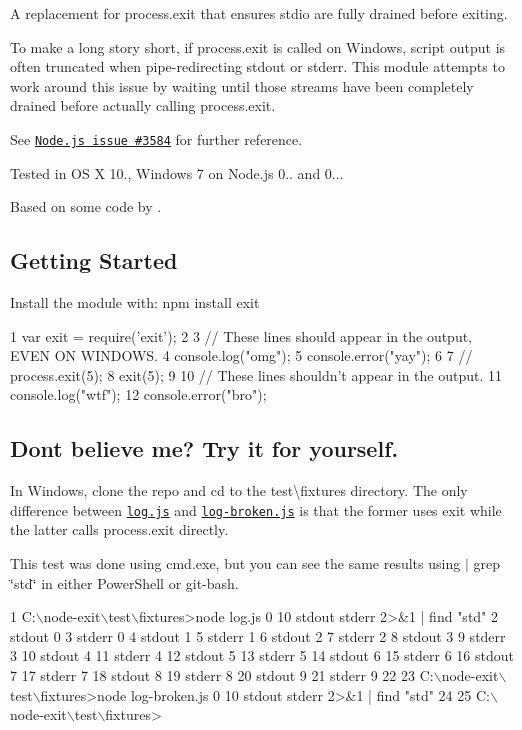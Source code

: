 A replacement for process.\+exit that ensures stdio are fully drained before exiting.

To make a long story short, if {\ttfamily process.\+exit} is called on Windows, script output is often truncated when pipe-\/redirecting {\ttfamily stdout} or {\ttfamily stderr}. This module attempts to work around this issue by waiting until those streams have been completely drained before actually calling {\ttfamily process.\+exit}.

See \href{https://github.com/joyent/node/issues/3584}{\tt Node.\+js issue \#3584} for further reference.

Tested in O\+S X 10., Windows 7 on Node.\+js 0.. and 0...

Based on some code by \href{https://github.com/vladikoff}{\tt }.

\subsection*{Getting Started}

Install the module with\+: {\ttfamily npm install exit}


\begin{DoxyCode}
1 var exit = require('exit');
2 
3 // These lines should appear in the output, EVEN ON WINDOWS.
4 console.log("omg");
5 console.error("yay");
6 
7 // process.exit(5);
8 exit(5);
9 
10 // These lines shouldn't appear in the output.
11 console.log("wtf");
12 console.error("bro");
\end{DoxyCode}


\subsection*{Don\textquotesingle{}t believe me? Try it for yourself.}

In Windows, clone the repo and cd to the {\ttfamily test\textbackslash{}fixtures} directory. The only difference between \href{test/fixtures/log.js}{\tt log.\+js} and \href{test/fixtures/log-broken.js}{\tt log-\/broken.\+js} is that the former uses {\ttfamily exit} while the latter calls {\ttfamily process.\+exit} directly.

This test was done using cmd.\+exe, but you can see the same results using {\ttfamily $\vert$ grep \char`\"{}std\char`\"{}} in either Power\+Shell or git-\/bash.


\begin{DoxyCode}
1 C:\(\backslash\)node-exit\(\backslash\)test\(\backslash\)fixtures>node log.js 0 10 stdout stderr 2>&1 | find "std"
2 stdout 0
3 stderr 0
4 stdout 1
5 stderr 1
6 stdout 2
7 stderr 2
8 stdout 3
9 stderr 3
10 stdout 4
11 stderr 4
12 stdout 5
13 stderr 5
14 stdout 6
15 stderr 6
16 stdout 7
17 stderr 7
18 stdout 8
19 stderr 8
20 stdout 9
21 stderr 9
22 
23 C:\(\backslash\)node-exit\(\backslash\)test\(\backslash\)fixtures>node log-broken.js 0 10 stdout stderr 2>&1 | find "std"
24 
25 C:\(\backslash\)node-exit\(\backslash\)test\(\backslash\)fixtures>
\end{DoxyCode}



